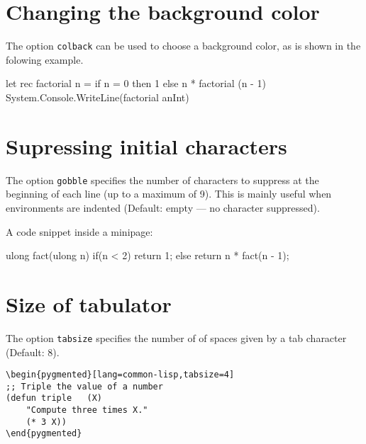 \documentclass[10pt,a4paper]{article}
\begin{document}
\section{Changing the background color}

The option \verb|colback| can be used to choose a background color, as
is shown in the folowing example.

\begin{Example}
\begin{pygmented}[lang=fsharp,colback=green!25]
let rec factorial n = 
    if n = 0 
    then 1 
    else n * factorial (n - 1)
System.Console.WriteLine(factorial anInt)
\end{pygmented}
\end{Example}


\section{Supressing initial characters}

The option \verb|gobble| specifies the number of characters to suppress
at the beginning of each line (up to a maximum of 9). This is mainly
useful when environments are indented (Default: empty — no character
suppressed).

\begin{Example}
A code snippet inside a minipage:
\begin{minipage}[t]{.5\linewidth}
    \begin{pygmented}[lang=d,gobble=8]
        ulong fact(ulong n)
        {
          if(n < 2)
            return 1;
          else
            return n * fact(n - 1);
        }
      \end{pygmented}
\end{minipage}
\end{Example}


\section{Size of tabulator}

The option \verb|tabsize| specifies the number of of spaces given by a
tab character (Default: 8).

\begin{Verbatim}[showtabs,tabsize=1]
\begin{pygmented}[lang=common-lisp,tabsize=4]
;; Triple the value of a number
(defun triple	(X)
	"Compute three times X."
	(* 3 X))
\end{pygmented}
\end{Verbatim}
\end{document}
